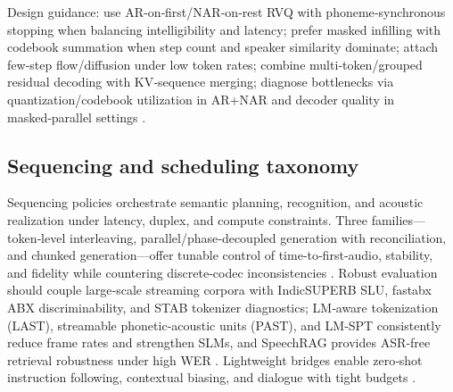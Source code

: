 \documentclass{article}
\begin{document}
Design guidance: use AR‑on‑first/NAR‑on‑rest RVQ with phoneme‑synchronous stopping when balancing intelligibility and latency; prefer masked infilling with codebook summation when step count and speaker similarity dominate; attach few‑step flow/diffusion under low token rates; combine multi‑token/grouped residual decoding with KV‑sequence merging; diagnose bottlenecks via quantization/codebook utilization in AR+NAR and decoder quality in masked‑parallel settings \cite{li2024masksrmaskedlanguagemodelfullbandspeechr,li2024investigatingneuralaudiocodecsspeechlang,wang2025tadicodectextawarediffusionspeechtokeniz}.

\subsection{Sequencing and scheduling taxonomy} \label{subsec:Sequencing and scheduling taxonomy}
Sequencing policies orchestrate semantic planning, recognition, and acoustic realization under latency, duplex, and compute constraints. Three families—token‑level interleaving, parallel/phase‑decoupled generation with reconciliation, and chunked generation—offer tunable control of time‑to‑first‑audio, stability, and fidelity while countering discrete‑codec inconsistencies \cite{liu2024analyzingmitigatinginconsistencydiscrete}. Robust evaluation should couple large‑scale streaming corpora with IndicSUPERB SLU, fastabx ABX discriminability, and STAB tokenizer diagnostics; LM‑aware tokenization (LAST), streamable phonetic‑acoustic units (PAST), and LM‑SPT consistently reduce frame rates and strengthen SLMs, and SpeechRAG provides ASR‑free retrieval robustness under high WER \cite{turetzky2024lastlanguagemodelawarespeechtokenization,har-tuv2025pastphoneticacousticspeechtokenizer,jo2025lmsptalignedsemanticdistillationspeechto,poli2025fastabxlibraryefficientcomputationabxdis,vashishth2024stabspeechtokenizerassessmentbenchmark,min2025speechretrievalaugmentedgenerationwithou,entry2025indicsuperbspeechprocessinguniversalperf}. Lightweight bridges enable zero‑shot instruction following, contextual biasing, and dialogue with tight budgets \cite{wang2023slmbridgethingapbetweenspeechtextfoundat}.
\end{document}
